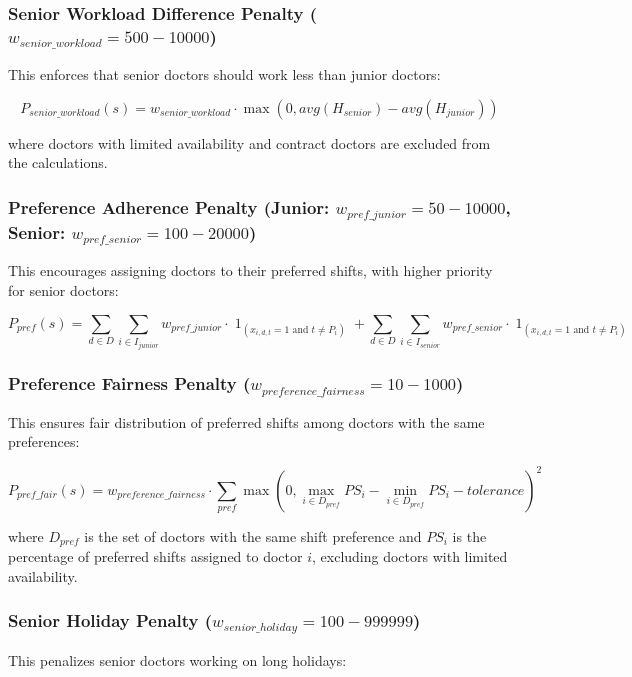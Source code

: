 \documentclass[12pt]{article}
\DeclareMathOperator{\ind}{1}
\begin{document}
\subsubsection{Senior Workload Difference Penalty ($w_{senior\_workload} = 500-10000$)}
This enforces that senior doctors should work less than junior doctors:

\begin{equation}
P_{senior\_workload}(s) = w_{senior\_workload} \cdot \max(0, avg(H_{senior}) - avg(H_{junior}))
\end{equation}

where doctors with limited availability and contract doctors are excluded from the calculations.

\subsubsection{Preference Adherence Penalty (Junior: $w_{pref\_junior} = 50-10000$, Senior: $w_{pref\_senior} = 100-20000$)}
This encourages assigning doctors to their preferred shifts, with higher priority for senior doctors:

\begin{equation}
P_{pref}(s) = \sum_{d \in D} \sum_{i \in I_{junior}} w_{pref\_junior} \cdot \ind_{(x_{i,d,t}=1 \text{ and } t \neq P_i)} + \sum_{d \in D} \sum_{i \in I_{senior}} w_{pref\_senior} \cdot \ind_{(x_{i,d,t}=1 \text{ and } t \neq P_i)}
\end{equation}

\subsubsection{Preference Fairness Penalty ($w_{preference\_fairness} = 10-1000$)}
This ensures fair distribution of preferred shifts among doctors with the same preferences:

\begin{equation}
P_{pref\_fair}(s) = w_{preference\_fairness} \cdot \sum_{pref} \max(0, \max_{i \in D_{pref}} PS_i - \min_{i \in D_{pref}} PS_i - tolerance)^2
\end{equation}

where $D_{pref}$ is the set of doctors with the same shift preference and $PS_i$ is the percentage of preferred shifts assigned to doctor $i$, excluding doctors with limited availability.

\subsubsection{Senior Holiday Penalty ($w_{senior\_holiday} = 100-999999$)}
This penalizes senior doctors working on long holidays:
\end{document}
